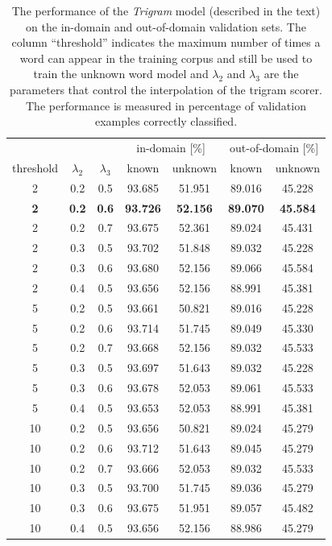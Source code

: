 \documentclass[11pt]{article}
\begin{document}
\begin{table}[phtb]
\begin{center}
\begin{tabular}{c cc cccc}
\toprule
&&& \multicolumn{2}{c}{in-domain [\%]} & \multicolumn{2}{c}{out-of-domain [\%]}\\
threshold & $\lambda_2$ & $\lambda_3$ & known & unknown & known & unknown \\\midrule
2 & 0.2 & 0.5 & 93.685 & 51.951 & 89.016 & 45.228\\
{\bf 2} & {\bf 0.2} & {\bf 0.6} & {\bf 93.726} & {\bf 52.156} & {\bf 89.070} &
{\bf 45.584}\\
2 & 0.2 & 0.7 & 93.675 & 52.361 & 89.024 & 45.431\\
2 & 0.3 & 0.5 & 93.702 & 51.848 & 89.032 & 45.228\\
2 & 0.3 & 0.6 & 93.680 & 52.156 & 89.066 & 45.584\\
2 & 0.4 & 0.5 & 93.656 & 52.156 & 88.991 & 45.381\\
5 & 0.2 & 0.5 & 93.661 & 50.821 & 89.016 & 45.228\\
5 & 0.2 & 0.6 & 93.714 & 51.745 & 89.049 & 45.330\\
5 & 0.2 & 0.7 & 93.668 & 52.156 & 89.032 & 45.533\\
5 & 0.3 & 0.5 & 93.697 & 51.643 & 89.032 & 45.228\\
5 & 0.3 & 0.6 & 93.678 & 52.053 & 89.061 & 45.533\\
5 & 0.4 & 0.5 & 93.653 & 52.053 & 88.991 & 45.381\\
10 & 0.2 & 0.5 & 93.656 & 50.821 & 89.024 & 45.279\\
10 & 0.2 & 0.6 & 93.712 & 51.643 & 89.045 & 45.279\\
10 & 0.2 & 0.7 & 93.666 & 52.053 & 89.032 & 45.533\\
10 & 0.3 & 0.5 & 93.700 & 51.745 & 89.036 & 45.279\\
10 & 0.3 & 0.6 & 93.675 & 51.951 & 89.057 & 45.482\\
10 & 0.4 & 0.5 & 93.656 & 52.156 & 88.986 & 45.279\\
\bottomrule
\end{tabular}
\end{center}
\caption{%
The performance of the \emph{Trigram} model (described in the text) on the
in-domain and out-of-domain validation sets.
The column ``threshold'' indicates the maximum number of times a word can
appear in the training corpus and still be used to train the unknown word
model and $\lambda_2$ and $\lambda_3$ are the parameters that control the
interpolation of the trigram scorer.
The performance is measured in percentage of validation examples correctly
classified.
\label{tab:trigram}}
\end{table}
\end{document}
